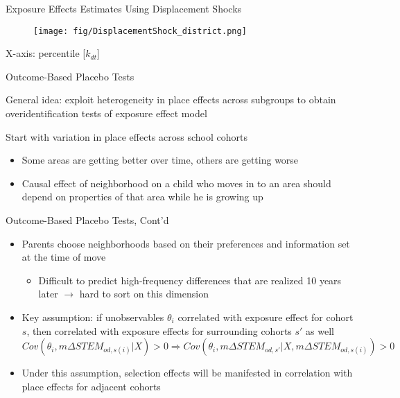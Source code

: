 \documentclass[aspectratio=169,xcolor=dvipsnames]{beamer}
\newenvironment{wideitemize}{\itemize\addtolength{\itemsep}{10pt}}{\enditemize}
\begin{document}
\begin{frame}{Exposure Effects Estimates Using Displacement Shocks}

\begin{figure}[H]
    \centering
    \texttt{[image: fig/DisplacementShock\_district.png]}
    \par\smallskip
\end{figure}
X-axis: percentile [$k_{dt}$]
\end{frame}

\begin{frame}{Outcome-Based Placebo Tests}\label{}
    \begin{wideitemize}
        \item General idea: exploit heterogeneity in place effects across subgroups to obtain overidentification tests of exposure effect model
        \item Start with variation in place effects across school cohorts
        \begin{itemize}
            \item Some areas are getting better over time, others are getting worse
            \item Causal effect of neighborhood on a child who moves in to an area should depend on properties of that area while he is growing up
        \end{itemize}
    \end{wideitemize}
\end{frame}

\begin{frame}{Outcome-Based Placebo Tests, Cont'd}\label{}
    \begin{itemize}
        \item Parents choose neighborhoods based on their preferences and information set at the time of move
        \begin{itemize}
            \item Difficult to predict high-frequency differences that are realized 10 years later $\rightarrow$ hard to sort on this dimension
        \end{itemize}
        \item Key assumption: if unobservables $\theta_i$ correlated with exposure effect for cohort $s$, then correlated with exposure effects for surrounding cohorts $s'$ as well
        $$Cov(\theta_i, m\Delta STEM_{od,s(i)}|X)>0 \Rightarrow Cov(\theta_i,m\Delta STEM_{od,s'}|X, m\Delta STEM_{od,s(i)})>0$$
        \item Under this assumption, selection effects will be manifested in correlation with place effects for adjacent cohorts
    \end{itemize}
\end{frame}
\end{document}
